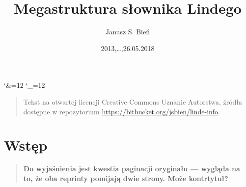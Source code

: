 \documentclass[12]{mwart}
\title{Megastruktura słownika Lindego}
\author{Janusz S. Bień}
\date{2013,\ldots,26.05.2018}
\begin{document}
\maketitle

\catcode`\&=12
\catcode`\_=12

\begin{quote}
  Tekst na otwartej licencji Creative Commons Uznanie Autorstwa,
  źródła dostępne w repozytorium
  \url{https://bitbucket.org/jsbien/linde-info}.
\end{quote}

\section{Wstęp}
\label{sec:wstp}

\begin{quote}
  \textbf{Do wyjaśnienia jest kwestia paginacji oryginału --- wygląda
    na to, że oba reprinty pomijają dwie strony. Może kontrtytuł?}
\end{quote}




\end{document}

